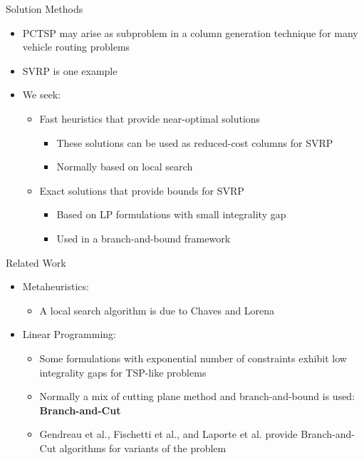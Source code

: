 \begin{frame}[t]{Solution Methods}
    \begin{itemize}
        \item<1-> PCTSP may arise as subproblem in a column generation technique for many vehicle routing problems
        \item<2-> SVRP is one example
        \item<3-> We seek:
            \begin{itemize}
                \item<4-> Fast heuristics that provide near-optimal solutions
                    \begin{itemize}
                        \item<5-> These solutions can be used as reduced-cost columns for SVRP
                        \item<6-> Normally based on local search
                    \end{itemize}
                \item<7-> Exact solutions that provide bounds for SVRP
                    \begin{itemize}
                        \item<8-> Based on LP formulations with small integrality gap
                        \item<9-> Used in a branch-and-bound framework
                    \end{itemize}
                    
            \end{itemize}
    \end{itemize}
\end{frame}


\begin{frame}[t]{Related Work}
\begin{itemize}
    \item<1-> Metaheuristics:
        \begin{itemize}
            \item<2-> A local search algorithm is due to Chaves and Lorena
        \end{itemize}
        \item<3-> Linear Programming:
        \begin{itemize}
            \item<4-> Some formulations with exponential number of constraints exhibit low integrality gaps for TSP-like problems
            \item<5-> Normally a mix of cutting plane method and branch-and-bound is used: \textbf{Branch-and-Cut}
            \item<6-> Gendreau et al., Fischetti et al., and Laporte et al. provide Branch-and-Cut algorithms for variants of the problem
        \end{itemize}
\end{itemize}
\end{frame}

